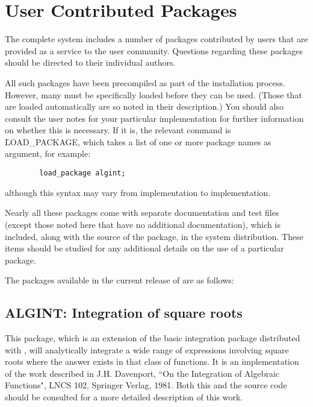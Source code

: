 \chapter{User Contributed Packages} 
\label{chap-user}
The complete {\REDUCE} system includes a number of packages contributed by
users that are provided as a service to the user community.  Questions
regarding these packages should be directed to their individual authors.

All such packages have been precompiled as part of the installation process.
However, many must be specifically loaded before they can be used. (Those
that are loaded automatically are so noted in their description.) You should
also consult the user notes for your particular implementation for further
information on whether this is necessary.  If it is, the relevant command is
\f{LOAD\_PACKAGE}, which takes a list of one or
more package names as argument, for example:

\begin{verbatim}
        load_package algint;
\end{verbatim}
although this syntax may vary from implementation to implementation.

Nearly all these packages come with separate documentation and test files
(except those noted here that have no additional documentation), which is
included, along with the source of the package, in the {\REDUCE} system
distribution.  These items should be studied for any additional details on
the use of a particular package.

\let\origsectionmark=\sectionmark
\def\sectionmark#1{}


The packages available in the current release of {\REDUCE} are as follows:

\newpage

\section{ALGINT: Integration of square roots} 
\label{ALGINT}

This package, which is an extension of the basic integration package
distributed with {\REDUCE}, will analytically integrate a wide range of
expressions involving square roots where the answer exists in that class
of functions. It is an implementation of the work described in J.H.
Davenport, ``On the Integration of Algebraic Functions", LNCS 102,
Springer Verlag, 1981.  Both this and the source code should be consulted
for a more detailed description of this work.

